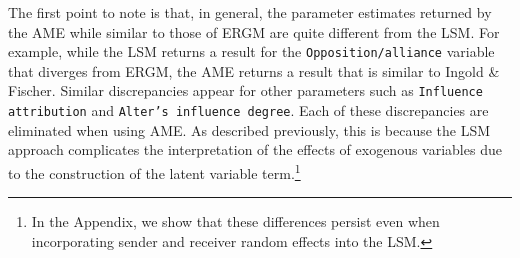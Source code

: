 \documentclass[12pt,pdflatex]{elsarticle}
\begin{document}
The first point to note is that, in general, the parameter estimates returned by the AME while similar to those of ERGM are quite different from the LSM. For example, while the LSM returns a result for the \texttt{Opposition/alliance} variable that diverges from ERGM, the AME returns a result that is similar to Ingold \& Fischer. Similar discrepancies appear for other parameters such as \texttt{Influence attribution} and \texttt{Alter's influence degree}. Each of these discrepancies are eliminated when using AME. As described previously, this is because the LSM approach complicates the interpretation of the effects of exogenous variables due to the construction of the latent variable term.\footnote{In the Appendix, we show that these differences persist even when incorporating sender and receiver random effects into the LSM.}
\end{document}
